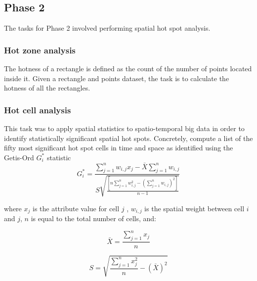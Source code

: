     \subsection{Phase 2} \label{Phase 1}%
    The tasks for Phase 2 involved performing spatial hot spot analysis.\\
    
    \subsubsection{Hot zone analysis}
    The hotness of a rectangle is defined as the count of the number of points located inside it. Given a rectangle and points dataset, the task is to calculate the hotness of all the rectangles.
    
    \subsubsection{Hot cell analysis}
    This task was to apply spatial statistics to spatio-temporal big data in order to identify statistically significant spatial hot spots. Concretely, compute a list of the fifty most significant hot spot cells in time and space as identified using the Getis-Ord $G_i^*$ statistic
    \begin{equation}
        G_i^*
        =
        \frac
        {
        \sum_{j=1}^{n}
        w_{i,j} x_j
        -
        \bar{X}
        \sum_{j=1}^{n}
        w_{i,j}
        }
        {
        S
        \sqrt
        {
        \frac
        {
        [
        n
        \sum_{j=1}^{n}
        w_{i,j}^2
        -
        (
        \sum_{j=1}^{n}
        w_{i,j}
        )^2
        ]
        }
        {
        n - 1
        }
        }
        }
    \end{equation}
    
    where $x_j$ is the attribute value for cell $j$ , $w_{i,j}$ is the spatial weight between cell $i$ and  $j$, $n$ is equal to the total number of cells, and:
    
    \begin{equation}
        \bar{X}
        =
        \frac
        {
        \sum_{j=1}^{n}
        x_j
        }
        {
        n
        }
    \end{equation}
    
    \begin{equation}
        S
        =
        \sqrt
        {
        \frac
        {
        \sum_{j=1}^{n}
        x_j^2
        }
        {
        n
        }
        -
        (
        \bar{X}
        )^2
        }
    \end{equation}

